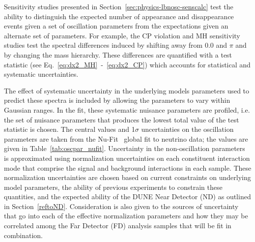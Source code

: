 Sensitivity studies presented in Section~\ref{sec:physics-lbnosc-senscalc} test the ability to distinguish
the expected number of \nue appearance and \numu disappearance events given a set of oscillation parameters
from the expectations given an alternate set of parameters. For example, the CP violation and MH sensitivity
studies test the spectral differences induced by shifting \deltacp away from 0.0 and $\pi$ and by changing the
mass hierarchy. These differences are quantified with a test statistic (see Eq.~\ref{eq:dx2_MH}~-~\ref{eq:dx2_CP}) 
which accounts for statistical and systematic uncertainties. 

The effect of systematic uncertainty in the underlying models parameters used to 
predict these spectra is included by allowing the parameters to vary within Gaussian ranges. In the fit,
these systematic nuisance parameters are profiled, i.e. the set of nuisance parameters that produces the
lowest total value of the test statistic is chosen.  The central values and 1$\sigma$ uncertainties on the oscillation
parameters are taken from the Nu-Fit~\cite{Gonzalez-Garcia:2014bfa} global fit to neutrino data; the values are
given in Table~\ref{tab:oscpar_nufit}. Uncertainty in the non-oscillation parameters is approximated using
normalization uncertainties on each constituent interaction mode that comprise the signal and background
interactions in each sample. These normalization uncertainties are chosen based on
current constraints on underlying model parameters, the ability of previous experiments to constrain
these quantities, and the expected ability of the DUNE Near Detector (ND) as outlined in Section~\ref{reftoND}.
Consideration is also given to the sources of uncertainty that go into each of the effective normalization
parameters and how they may be correlated among the Far Detector (FD) analysis samples that will be fit in
combination.


